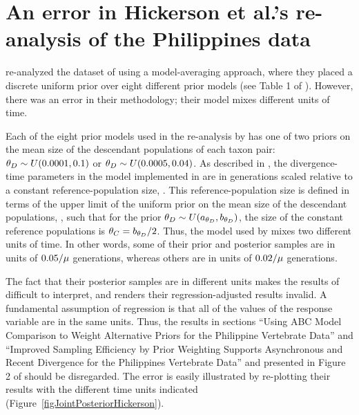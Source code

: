 \section*{An error in Hickerson et al.'s re-analysis of the Philippines data}
\citet{Hickerson2013} re-analyzed the dataset of \citet{Oaks2012} using a
model-averaging approach, where they placed a discrete uniform prior over eight
different prior models (see Table 1 of \citet{Hickerson2013}).
However, there was an error in their methodology; their model mixes different
units of time.

Each of the eight prior models used in the re-analysis by \citet{Hickerson2013}
has one of two priors on the mean size of the descendant populations of each
taxon pair:
$\meanDescendantTheta{} \sim U(0.0001, 0.1)$ or
$\meanDescendantTheta{} \sim U(0.0005, 0.04)$.
As described in \citet{Oaks2012}, the divergence-time parameters in the model
implemented in \msb are in generations scaled relative to a constant
reference-population size, .
This reference-population size is defined in terms of the upper limit of the
uniform prior on the mean size of the descendant populations,
\meanDescendantTheta{}, such that for the prior $\meanDescendantTheta{} \sim
U(\uniformMin{\meanDescendantTheta{}},\uniformMax{\meanDescendantTheta{}})$,
the size of the constant reference populations is $\myTheta{C} =
\uniformMax{\meanDescendantTheta{}}/2$.
Thus, the model used by \citet{Hickerson2013} mixes two different units of
time.
In other words, some of their prior and posterior samples are in units of
$0.05/\mu$ generations, whereas others are in units of
$0.02/\mu$ generations.

The fact that their posterior samples are in different units makes the results
of \citet{Hickerson2013} difficult to interpret, and renders their
regression-adjusted results invalid.
A fundamental assumption of regression is that all of the values of the
response variable are in the same units.
Thus, the results in sections ``Using ABC Model Comparison to Weight
Alternative Priors for the Philippine Vertebrate Data'' and ``Improved Sampling
Efficiency by Prior Weighting Supports Asynchronous and Recent Divergence for
the Philippines Vertebrate Data'' and presented in Figure 2 of
\citet{Hickerson2013} should be disregarded.
The error is easily illustrated by re-plotting their results with the different
time units indicated (Figure~\ref{figJointPosteriorHickerson}).

